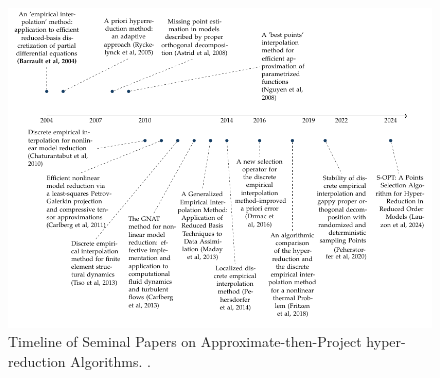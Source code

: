 \documentclass[11pt]{article}
\begin{document}
        \begin{figure}
            \centering
            \includegraphics[width=\textwidth]{ATP.pdf}
            \caption{Timeline of Seminal Papers on Approximate-then-Project hyper-reduction Algorithms. \cite{barrault2004empirical,ryckelynck2005priori,nguyen2007best,astrid2008missing,chaturantabut2010nonlinear,carlberg2011efficient,tiso2013discrete,carlberg2013gnat,peherstorfer2014localized,drmac2016new,peherstorfer2020stability,lauzon2024s-opt,Fritzen_2018,Maday_2013}.}
            \label{fig:ATP_LIT}
        \end{figure}
\end{document}
